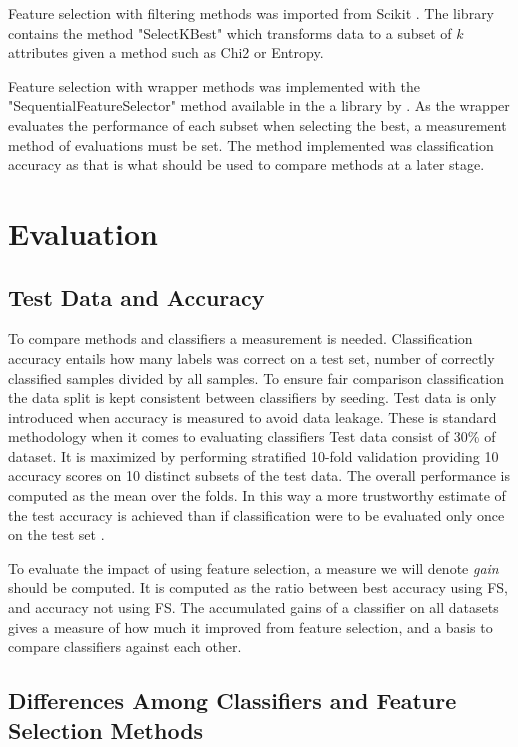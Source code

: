 Feature selection with filtering methods was imported from Scikit \parencite{scikit-learn}. The library contains the method "SelectKBest" which transforms data to a subset of $k$ attributes given a method such as Chi2 or Entropy.

Feature selection with wrapper methods was implemented with the "SequentialFeatureSelector" method available in the a library by \textcite{mlextend}. As the wrapper evaluates the performance of each subset when selecting the best, a measurement method of evaluations must be set. The method implemented was classification accuracy as that is what should be used to compare methods at a later stage.


\section{Evaluation}
\label{Evaluation}

\subsection{Test Data and Accuracy}

To compare methods and classifiers a measurement is needed. Classification accuracy entails how many labels was correct on a test set, number of correctly classified samples divided by all samples. To ensure fair comparison classification the data split is kept consistent between classifiers by seeding. Test data is only introduced when accuracy is measured to avoid data leakage. These is standard methodology when it comes to evaluating classifiers \parencite{James:2014} Test data consist of 30\% of dataset. It is maximized by performing stratified 10-fold validation providing 10 accuracy scores on 10 distinct subsets of the test data. The overall performance is computed as the mean over the folds. In this way a more trustworthy estimate of the test accuracy is achieved than if classification were to be evaluated only once on the test set \parencite{James:2014}.

To evaluate the impact of using feature selection, a measure we will denote \textit{gain} should be computed. It is computed as the ratio between best accuracy using FS, and accuracy not using FS. The accumulated gains of a classifier on all datasets gives a measure of how much it improved from feature selection, and a basis to compare classifiers against each other.

\subsection{Differences Among Classifiers and Feature Selection Methods}

